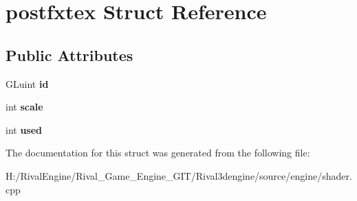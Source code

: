 \hypertarget{structpostfxtex}{}\section{postfxtex Struct Reference}
\label{structpostfxtex}
\subsection*{Public Attributes}
\begin{DoxyCompactItemize}
\item 
\mbox{\label{structpostfxtex_a76d3ba0e52f399979c490f43fbda465f}} 
G\+Luint {\bfseries id}
\item 
\mbox{\label{structpostfxtex_a60fc6bee4b516c32667fbd68b8f6e28f}} 
int {\bfseries scale}
\item 
\mbox{\label{structpostfxtex_a30d67e0f4dcdf69e257161a39a4a0ed4}} 
int {\bfseries used}
\end{DoxyCompactItemize}


The documentation for this struct was generated from the following file\+:\begin{DoxyCompactItemize}
\item 
H\+:/\+Rival\+Engine/\+Rival\+\_\+\+Game\+\_\+\+Engine\+\_\+\+G\+I\+T/\+Rival3dengine/source/engine/shader.\+cpp\end{DoxyCompactItemize}
